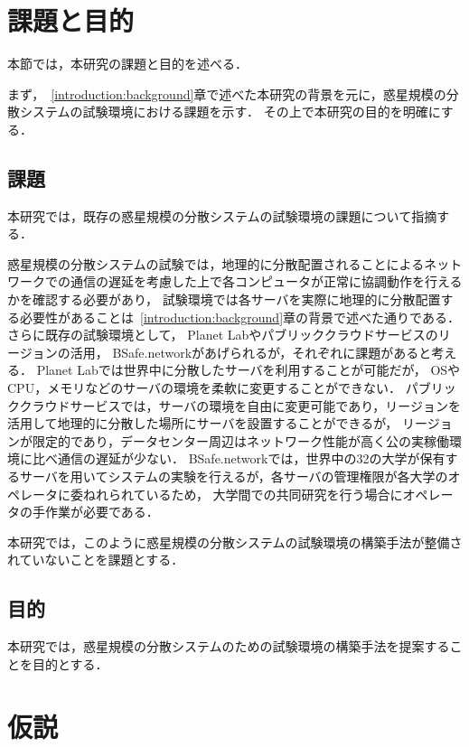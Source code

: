 \section{課題と目的}
\label{introduction:issue-aim}

本節では，本研究の課題と目的を述べる．

まず，~\ref{introduction:background}章で述べた本研究の背景を元に，惑星規模の分散システムの試験環境における課題を示す．
その上で本研究の目的を明確にする．

\subsection{課題}
\label{introduction:issue-aim:issue}

本研究では，既存の惑星規模の分散システムの試験環境の課題について指摘する．

惑星規模の分散システムの試験では，地理的に分散配置されることによるネットワークでの通信の遅延を考慮した上で各コンピュータが正常に協調動作を行えるかを確認する必要があり，
試験環境では各サーバを実際に地理的に分散配置する必要性があることは~\ref{introduction:background}章の背景で述べた通りである．
さらに既存の試験環境として， Planet Labやパブリッククラウドサービスのリージョンの活用， BSafe.networkがあげられるが，それぞれに課題があると考える．
Planet Labでは世界中に分散したサーバを利用することが可能だが， OSやCPU，メモリなどのサーバの環境を柔軟に変更することができない．
パブリッククラウドサービスでは，サーバの環境を自由に変更可能であり，リージョンを活用して地理的に分散した場所にサーバを設置することができるが，
リージョンが限定的であり，データセンター周辺はネットワーク性能が高く公の実稼働環境に比べ通信の遅延が少ない．
BSafe.networkでは，世界中の32の大学が保有するサーバを用いてシステムの実験を行えるが，各サーバの管理権限が各大学のオペレータに委ねれられているため，
大学間での共同研究を行う場合にオペレータの手作業が必要である．

本研究では，このように惑星規模の分散システムの試験環境の構築手法が整備されていないことを課題とする．

\subsection{目的}
\label{introduction:issue-aim:aim}

本研究では，惑星規模の分散システムのための試験環境の構築手法を提案することを目的とする．

\section{仮説}
\label{introduction:hypothesis}

